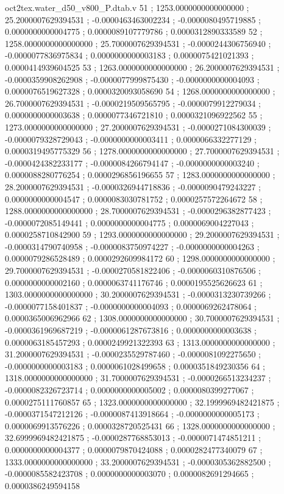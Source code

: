 \begin{filecontents}[overwrite]{oct2tex.water_d50_v800_P.dtab.v}
51 ; 1253.0000000000000000 ; 25.2000007629394531 ; -0.0000463463002234 ; -0.0000080495719885 ; 0.0000000000004775 ; 0.0000089107779786 ; 0.0000312890333589
52 ; 1258.0000000000000000 ; 25.7000007629394531 ; -0.0000244306756940 ; -0.0000077836975834 ; 0.0000000000003183 ; 0.0000075421021393 ; 0.0000414939604525
53 ; 1263.0000000000000000 ; 26.2000007629394531 ; -0.0000359908262908 ; -0.0000077999875430 ; -0.0000000000004093 ; 0.0000076519627328 ; 0.0000320093058690
54 ; 1268.0000000000000000 ; 26.7000007629394531 ; -0.0000219509565795 ; -0.0000079912279034 ; 0.0000000000003638 ; 0.0000077346721810 ; 0.0000321096922562
55 ; 1273.0000000000000000 ; 27.2000007629394531 ; -0.0000271084300039 ; -0.0000079328729043 ; -0.0000000000003411 ; 0.0000066332277129 ; 0.0000319495775329
56 ; 1278.0000000000000000 ; 27.7000007629394531 ; -0.0000424382233177 ; -0.0000084266794147 ; -0.0000000000003240 ; 0.0000088280776254 ; 0.0000296856196655
57 ; 1283.0000000000000000 ; 28.2000007629394531 ; -0.0000326944718836 ; -0.0000090479243227 ; 0.0000000000004547 ; 0.0000083030781752 ; 0.0000257572264672
58 ; 1288.0000000000000000 ; 28.7000007629394531 ; -0.0000296382877423 ; -0.0000072085149441 ; 0.0000000000004775 ; 0.0000069004227043 ; 0.0000258710842900
59 ; 1293.0000000000000000 ; 29.2000007629394531 ; -0.0000314790740958 ; -0.0000083750974227 ; -0.0000000000004263 ; 0.0000079286528489 ; 0.0000292609984172
60 ; 1298.0000000000000000 ; 29.7000007629394531 ; -0.0000270581822406 ; -0.0000060310876506 ; 0.0000000000002160 ; 0.0000063741176746 ; 0.0000195525626623
61 ; 1303.0000000000000000 ; 30.2000007629394531 ; -0.0000313230739266 ; -0.0000077158401837 ; -0.0000000000004093 ; 0.0000069262478064 ; 0.0000365006962966
62 ; 1308.0000000000000000 ; 30.7000007629394531 ; -0.0000361969687219 ; -0.0000061287673816 ; 0.0000000000003638 ; 0.0000063185457293 ; 0.0000249921322393
63 ; 1313.0000000000000000 ; 31.2000007629394531 ; -0.0000235529787460 ; -0.0000081092275650 ; -0.0000000000003183 ; 0.0000061028499658 ; 0.0000351849230356
64 ; 1318.0000000000000000 ; 31.7000007629394531 ; -0.0000266513234237 ; -0.0000082326723714 ; 0.0000000000005002 ; 0.0000080399277067 ; 0.0000275111760857
65 ; 1323.0000000000000000 ; 32.1999969482421875 ; -0.0000371547212126 ; -0.0000087413918664 ; -0.0000000000005173 ; 0.0000069913576226 ; 0.0000328720525431
66 ; 1328.0000000000000000 ; 32.6999969482421875 ; -0.0000287768853013 ; -0.0000071474851211 ; 0.0000000000004377 ; 0.0000079870424088 ; 0.0000282477340079
67 ; 1333.0000000000000000 ; 33.2000007629394531 ; -0.0000305362882500 ; -0.0000085582423708 ; 0.0000000000003070 ; 0.0000082691294665 ; 0.0000386249594158

\end{filecontents}

